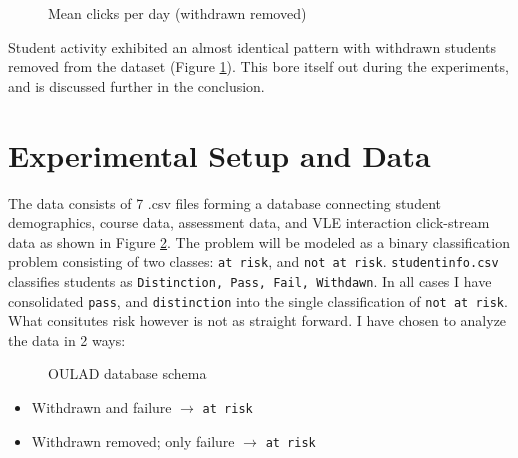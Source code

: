 \documentclass{article}
\begin{document}
\begin{figure}[ht!]
	\centering
	\caption{Mean clicks per day (withdrawn removed)}
	\label{fig:clicks_per_day_nowd}
\end{figure}
Student activity exhibited an almost identical pattern with withdrawn students removed from the dataset (Figure \ref{fig:clicks_per_day_nowd}). This bore itself out during the experiments, and is discussed further in the conclusion.
\pagebreak[4]
\section{Experimental Setup and Data}
The data consists of 7 .csv files forming a database connecting student demographics, course data, assessment data, and VLE interaction click-stream data as shown in Figure \ref{fig:schema}. The problem will be modeled as a binary classification problem consisting of two classes: \texttt{at risk}, and \texttt{not at risk}. \texttt{studentinfo.csv} classifies students as \texttt{Distinction, Pass, Fail, Withdawn}. In all cases I have consolidated \texttt{pass}, and \texttt{distinction} into the single classification of \texttt{not at risk}. What consitutes risk however is not as straight forward. I have chosen to analyze the data in 2 ways:
\begin{figure}[ht!]
	\centering
	\caption{OULAD database schema}
	\label{fig:schema}
\end{figure}
\begin{itemize}
    	\item Withdrawn and failure $\rightarrow$ \texttt{at risk}
	\item Withdrawn removed; only failure $\rightarrow$ \texttt{at risk}
\end{itemize}
\end{document}
